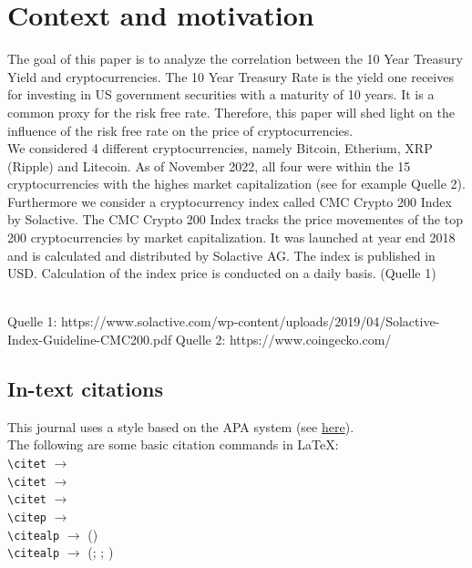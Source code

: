 \documentclass[11pt]{article}
\begin{document}

\pagebreak{}


\setcounter{page}{1}
\section{Context and motivation}


The goal of this paper is to analyze the correlation between the 10 Year Treasury Yield and cryptocurrencies. The 10 Year Treasury Rate is the yield one receives for investing in US government securities with a maturity of 10 years. It is a common proxy for the risk free rate. Therefore, this paper will shed light on the influence of the risk free rate on the price of cryptocurrencies. \\

We considered 4 different cryptocurrencies, namely Bitcoin, Etherium,  XRP (Ripple) and Litecoin. As of November 2022, all four were within the 15 cryptocurrencies with the highes market capitalization (see for example Quelle 2). Furthermore we consider a cryptocurrency index called  CMC Crypto 200 Index by Solactive. The CMC Crypto 200 Index tracks the price movementes of the top 200 cryptocurrencies by market capitalization. It was launched at year end 2018 and is calculated and distributed by Solactive AG. The index is published in USD. Calculation of the index price is conducted on a daily basis. (Quelle 1)



\\

Quelle 1: https://www.solactive.com/wp-content/uploads/2019/04/Solactive-Index-Guideline-CMC200.pdf
Quelle 2: https://www.coingecko.com/


\subsection{In-text citations}
This journal uses a style based on the APA system (see \href{https://openhumanitiesdata.metajnl.com/about/submissions/#References}{here}). \\
The following are some basic citation commands in \LaTeX: \\

\noindent
\verb|\citet| $\rightarrow$ \citet{jenset&mcgil}\\
\verb|\citet| $\rightarrow$ \citet{australiashealth}\\
\verb|\citet| $\rightarrow$ \citet{shree-a}\\
\verb|\citep| $\rightarrow$ \citep{fabricius-hansen2012b}\\
\verb|\citealp| $\rightarrow$ (\citealp{eckhoff2018a})\\
\verb|\citealp| $\rightarrow$ (\citealp{eckhoff2018a}; \citealp{fabricius-hansen2012b}; \citealp{shree-a})\\
\end{document}
